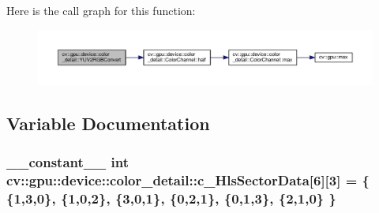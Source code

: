 Here is the call graph for this function\-:\nopagebreak
\begin{figure}[H]
\begin{center}
\leavevmode
\includegraphics[width=350pt]{namespacecv_1_1gpu_1_1device_1_1color__detail_a2394dced2f560842991071f0bf1d6be0_cgraph}
\end{center}
\end{figure}




\subsection{Variable Documentation}
\hypertarget{namespacecv_1_1gpu_1_1device_1_1color__detail_afec4abf631a0b58ee4cb02fe320af62e}{
\subsubsection[{c\-\_\-\-Hls\-Sector\-Data}]{\setlength{\rightskip}{0pt plus 5cm}\-\_\-\-\_\-constant\-\_\-\-\_\- int cv\-::gpu\-::device\-::color\-\_\-detail\-::c\-\_\-\-Hls\-Sector\-Data\mbox{[}6\mbox{]}\mbox{[}3\mbox{]} = \{ \{1,3,0\}, \{1,0,2\}, \{3,0,1\}, \{0,2,1\}, \{0,1,3\}, \{2,1,0\} \}}}\label{namespacecv_1_1gpu_1_1device_1_1color__detail_afec4abf631a0b58ee4cb02fe320af62e}
